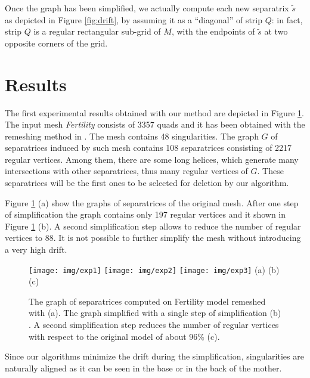 \documentclass[11pt,a4paper]{article}
\begin{document}
Once the graph has been simplified, we actually compute each new separatrix $\tilde{s}$ as depicted in Figure \ref{fig:drift}, by assuming it as a ``diagonal'' of strip $Q$:
in fact, strip $Q$ is a regular rectangular sub-grid of $M$, with the endpoints of  $\tilde{s}$ at two opposite corners of the grid. 

\section{Results}
\label{sec:results}

The first experimental results obtained with our method are depicted in Figure \ref{fig:fert}.
The input mesh \emph{Fertility} consists of 3357 quads and it has been obtained with the remeshing method in \cite{BomZimKob09}.
The mesh contains 48 singularities.
The graph $G$ of separatrices induced by such mesh contains 108 separatrices consisting of 2217 regular vertices.
Among them, there are some long helices, which generate many intersections with other separatrices, thus many regular vertices of $G$.
These separatrices will be the first ones to be selected for deletion by our algorithm.

Figure \ref{fig:fert} (a) show the graphs of separatrices of the original mesh. After one step of simplification the graph contains only 197 regular vertices and it shown in Figure \ref{fig:fert} (b). A second simplification step allows to reduce the number of regular vertices to 88. It is not possible to further simplify the mesh without introducing a very high drift.

\begin{figure}
\centering
\texttt{[image: img/exp1]} 
\texttt{[image: img/exp2]} 
\texttt{[image: img/exp3]} 
\hspace{1.5cm} (a) \hspace{4cm} (b) \hspace{4cm} (c) 

\hfill\mbox{}
\caption{\label{fig:fert} The graph of separatrices computed on Fertility model remeshed with \cite{BomZimKob09} (a). The graph simplified with a single step of simplification (b) . A second simplification step reduces the number of regular vertices with respect to the original model of about 96\% (c).
}
\end{figure}

Since our algorithms minimize the drift during the simplification, singularities are naturally aligned as it can be seen in the base or in the back of the mother. 
\end{document}
